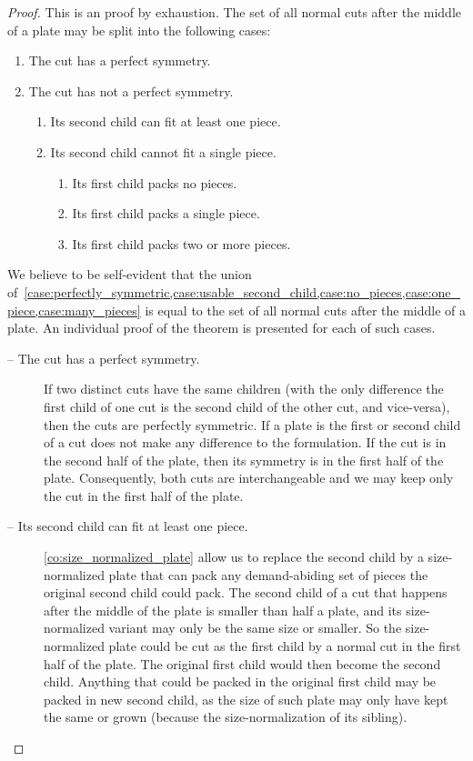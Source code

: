 \documentclass[runningheads]{llncs}
\begin{document}
\begin{proof}
This is an proof by exhaustion. The set of all normal cuts after the middle of a plate may be split into the following cases:
\begin{enumerate}
  \item The cut has a perfect symmetry. \label{case:perfectly_symmetric}
  \item The cut has not a perfect symmetry.
  \begin{enumerate}
    \item Its second child can fit at least one piece. \label{case:usable_second_child}
    \item Its second child cannot fit a single piece.
    \begin{enumerate}
      \item Its first child packs no pieces. \label{case:no_pieces}
      \item Its first child packs a single piece. \label{case:one_piece} %
      \item Its first child packs two or more pieces. \label{case:many_pieces}
    \end{enumerate}
  \end{enumerate}
\end{enumerate}

We believe to be self-evident that the union of~\cref{case:perfectly_symmetric,case:usable_second_child,case:no_pieces,case:one_piece,case:many_pieces} is equal to the set of all normal cuts after the middle of a plate. An individual proof of the theorem is presented for each of such cases.

\begin{description}
\item[ -- The cut has a perfect symmetry.]
If two distinct cuts have the same children (with the only difference the first child of one cut is the second child of the other cut, and vice-versa), then the cuts are perfectly symmetric.
If a plate is the first or second child of a cut does not make any difference to the formulation.
If the cut is in the second half of the plate, then its symmetry is in the first half of the plate.
Consequently, both cuts are interchangeable and we may keep only the cut in the first half of the plate.
\item[ -- Its second child can fit at least one piece.]
\autoref{co:size_normalized_plate} allow us to replace the second child by a size-normalized plate that can pack any demand-abiding set of pieces the original second child could pack.
The second child of a cut that happens after the middle of the plate is smaller than half a plate, and its size-normalized variant may only be the same size or smaller.
So the size-normalized plate could be cut as the first child by a normal cut in the first half of the plate.
The original first child would then become the second child.
Anything that could be packed in the original first child may be packed in new second child, as the size of such plate may only have kept the same or grown (because the size-normalization of its sibling).


\end{description}
\end{proof}
\end{document}
